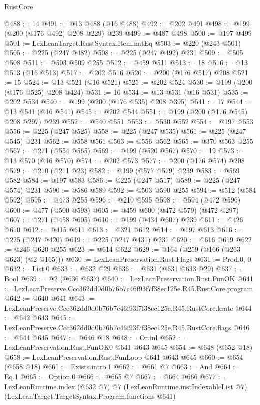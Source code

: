 \begin{lexlean}{RustCore}
\begin{coremodule}
@488 := 14
@491 := @13 @488 (@16 @488)
@492 := @202 @491
@498 := @199 (@200 (@176 @492) @208 @229) @239
@499 := @487 @498
@500 := @197 @499
@501 := LexLeanTarget.RustSyntax.Item.natEq
@503 := @220 (@243 @501)
@505 := @225 (@247 @482)
@508 := @225 (@247 @492) @231
@509 := @505 @508
@511 := @503 @509 @255
@512 := @459 @511
@513 := 18
@516 := @13 @513 (@16 @513)
@517 := @202 @516
@520 := @200 (@176 @517) @208
@521 := 15
@524 := @13 @521 (@16 @521)
@525 := @202 @524
@530 := @199 (@200 (@176 @525) @208 @424)
@531 := 16
@534 := @13 @531 (@16 @531)
@535 := @202 @534
@540 := @199 (@200 (@176 @535) @208 @395)
@541 := 17
@544 := @13 @541 (@16 @541)
@545 := @202 @544
@551 := @199 (@200 (@176 @545) @208 @297) @239
@552 := @540 @551
@553 := @530 @552
@554 := @197 @553
@556 := @225 (@247 @525)
@558 := @225 (@247 @535)
@561 := @225 (@247 @545) @231
@562 := @558 @561
@563 := @556 @562
@565 := @370 @563 @255
@567 := @271 (@554 @565)
@569 := @199 (@520 @567)
@570 := 19
@573 := @13 @570 (@16 @570)
@574 := @202 @573
@577 := @200 (@176 @574) @208
@579 := @210 (@211 @23)
@582 := @199 (@577 @579) @239
@583 := @569 @582
@584 := @197 @583
@586 := @225 (@247 @517)
@589 := @225 (@247 @574) @231
@590 := @586 @589
@592 := @503 @590 @255
@594 := @512 (@584 @592)
@595 := @473 @255
@596 := @210 @595
@598 := @594 (@472 @596)
@600 := @477 (@500 @598)
@605 := @459 @600 (@472 @579) (@472 @297)
@607 := @271 (@458 @605)
@610 := @199 (@434 @607) @239
@611 := @426 @610
@612 := @415 @611
@613 := @321 @612
@614 := @197 @613
@616 := @225 (@247 @420)
@619 := @225 (@247 @431) @231
@620 := @616 @619
@622 := @246 @620 @255
@623 := @614 @622
@629 := @164 (@259 (@166 (@263 @623) (@2 @165)))
@630 := LexLeanPreservation.Rust.Flags
@631 := Prod.{0, 0}
@632 := List.{0}
@633 := @632 @29
@636 := @631 (@631 @633 @29)
@637 := Bool
@639 := @2 (@636 @637)
@640 := LexLeanPreservation.Rust.FunOK
@641 := LexLeanPreserve.Ccc362dd0d0b76b7c46f93f7f38ec125e.R45.RustCore.program
@642 := @640 @641
@643 := LexLeanPreserve.Ccc362dd0d0b76b7c46f93f7f38ec125e.R45.RustCore.krate
@644 := @642 @643
@645 := LexLeanPreserve.Ccc362dd0d0b76b7c46f93f7f38ec125e.R45.RustCore.flags
@646 := @644 @645
@647 := @646 @18
@648 := Or.inl
@652 := LexLeanPreservation.Rust.FunOK0 @641 @643 @645
@654 := @648 (@652 @18)
@658 := LexLeanPreservation.Rust.FunLoop @641 @643 @645
@660 := @654 (@658 @18)
@661 := Exists.intro.{1}
@662 := @661 @7
@663 := And
@664 := Eq.{1}
@665 := Option.{0}
@666 := @665 @7
@667 := @664 @666
@677 := LexLeanRuntime.index
    (@632 @7)
    @7
    (LexLeanRuntime.instIndexableList @7)
    (LexLeanTarget.TargetSyntax.Program.functions @641)

\end{coremodule}
\end{lexlean}

